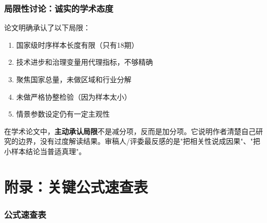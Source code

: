 \documentclass[12pt, a4paper]{article}
\begin{document}
\section{局限性讨论：诚实的学术态度}

论文明确承认了以下局限：
\begin{enumerate}[leftmargin=2em]
\item 国家级时序样本长度有限（只有18期）
\item 技术进步和治理变量用代理指标，不够精确
\item 聚焦国家总量，未做区域和行业分解
\item 未做严格协整检验（因为样本太小）
\item 情景参数设定仍有一定主观性
\end{enumerate}

\begin{tipbox}[为什么要写局限性？]
在学术论文中，\textbf{主动承认局限}不是减分项，反而是加分项。它说明作者清楚自己研究的边界，没有过度解读结果。审稿人/评委最反感的是"把相关性说成因果"、"把小样本结论当普适真理"。
\end{tipbox}

\part{附录：关键公式速查表}

\newpage
\section{公式速查表}
\end{document}
